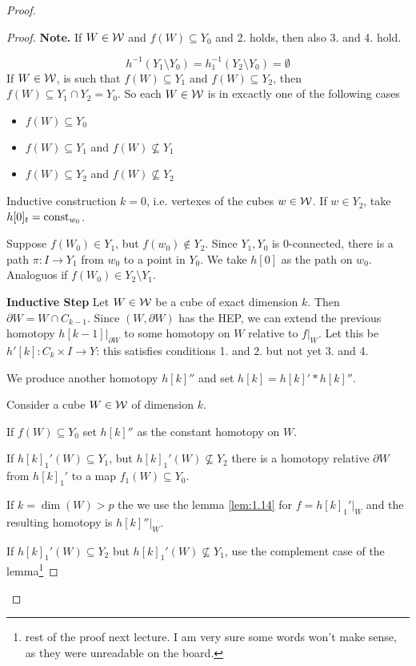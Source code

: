 \documentclass[language=english]{TemplateLecture}
\begin{document}
\begin{proof}
\begin{proof}
        \textbf{Note.} If \(W \in \mathcal{W}\) and \(f(W)\subseteq Y_0\) and 2. holds, then also 3. and 4. hold.

        \[h^{-1}(Y_1\setminus Y_0) = h_1^{-1}(Y_2\setminus Y_0) = \emptyset\]
        If \(W \in \mathcal{W}\), is such that \(f(W) \subseteq Y_1\) and \(f(W) \subseteq Y_2\), then \(f(W)\subseteq Y_1\cap Y_2 = Y_0\). So each \(W \in \mathcal{W}\) is in excactly one of the following cases
        \begin{itemize}
            \item \(f(W) \subseteq Y_0\)
            \item \(f(W) \subseteq Y_1\) and \(f(W) \not\subseteq Y_1\)
            \item \(f(W) \subseteq Y_2\) and \(f(W)\not \subseteq Y_2\)
        \end{itemize}
        Inductive construction \(k = 0\), i.e. vertexes of the cubes \(w \in \mathcal{W}\). If \(w\in Y_2\), take \(h[0]_t = \operatorname{const}_{w_0}\).

        Suppose \(f(W_0)\in Y_1\), but \(f(w_0) \not \in Y_2\). Since \(Y_1,Y_0\) is \(0\)-connected, there is a path \(\pi\colon I \to Y_1\) from \(w_0\) to a point in \(Y_0\). We take \(h[0]\) as the path on \(w_0\). Analoguos if \(f(W_0)\in Y_2\setminus Y_1\).

        \textbf{Inductive Step} Let \(W \in \mathcal{W}\) be a cube of exact dimension \(k\). Then \(\partial W = W \cap C_{k-1}\). Since \((W, \partial W)\) has the HEP, we can extend the previous homotopy \(h[k-1]\rvert_{\partial W}\) to some homotopy on \(W\) relative to \(f\rvert_W\). Let this be \(h'[k]\colon C_k\times I \to Y\): this satisfies conditions 1. and 2. but not yet 3. and 4.

        We produce another homotopy \(h[k]''\) and set \(h[k] = h[k]' * h[k]''\).

        Consider a cube \(W \in \mathcal{W}\) of dimension \(k\).

        If \(f(W) \subseteq Y_0\) set \(h[k]''\) as the constant homotopy on \(W\).

        If \(h[k]_1'(W) \subseteq Y_1\), but \(h[k]_1'(W) \not \subseteq Y_2\) there is a homotopy relative \(\partial W\) from \(h[k]_1'\) to a map \(f_1(W)\subseteq Y_0\).

        If \(k = \dim(W) > p\) the we use the lemma \ref{lem:1.14} for \(f = h[k]_1'\rvert_W\) and the resulting homotopy is \(h[k]''\rvert_W\).

        If \(h[k]_1'(W)\subseteq Y_2\) but \(h[k]_1'(W) \not \subseteq Y_1\), use the complement case of the lemma\footnote{rest of the proof next lecture. I am very sure some words won't make sense, as they were unreadable on the board.}
    \end{proof}


\end{proof}
\end{document}
